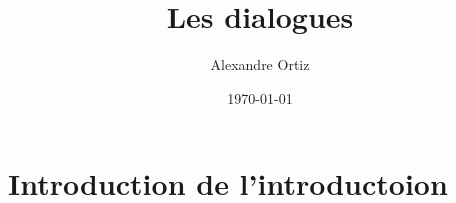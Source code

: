 \documentclass{article}
\title{Les dialogues}
\date{\today}
\author{Alexandre Ortiz}
\begin{document}
\maketitle

\section{Introduction de l'introductoion}
\end{document}
